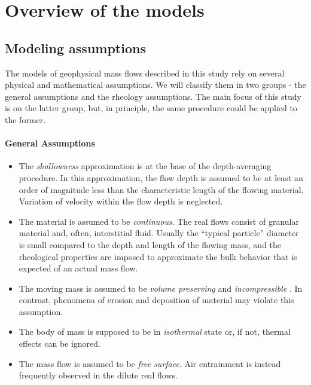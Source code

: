 \documentclass{article}
\begin{document}
\section{Overview of the models}\label{sec:GeoPhFlows}

\subsection{Modeling assumptions}\label{subsec:ModelAssump}
The models of geophysical mass flows described in this study rely on several physical and mathematical assumptions. We will classify them in two groups - the general assumptions and the rheology assumptions. The main focus of this study is on the latter group, but, in principle, the same procedure could be applied to the former.

\paragraph{General Assumptions}
\begin{itemize}
\item The \textit{shallowness} approximation is at the base of the depth-averaging procedure. In this approximation, the flow depth is assumed to be at least an order of magnitude less than the characteristic length of the flowing material. Variation of velocity within the flow depth is neglected.

\item The material is assumed to be \textit{continuous}. The real flows consist of granular material and, often, interstitial fluid. Usually the ``typical particle'' diameter is small compared to the depth and length of the flowing mass, and the rheological properties are imposed to approximate the bulk behavior that is expected of an actual mass flow.

\item The moving mass is assumed to be \textit{volume preserving} and \textit{incompressible} . In contrast, phenomena of erosion and deposition of material may violate this assumption.


\item The body of mass is supposed to be in \textit{isothermal} state or, if not, thermal effects can be ignored.

\item The mass flow is assumed to be \textit{free surface}. Air entrainment is instead frequently observed in the dilute real flows.
%
\end{itemize}
\end{document}
